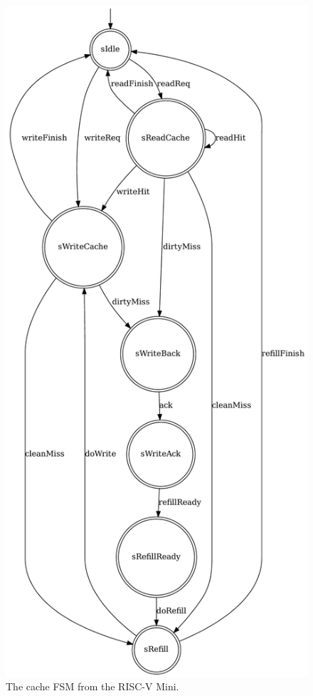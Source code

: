 \documentclass[sigplan,anonymous,review]{acmart}
\begin{document}
\begin{figure}
    \centering
    \includegraphics[width=0.7\linewidth]{figures/cacheFSM.pdf}
    \caption{The cache FSM from the RISC-V Mini.}
    \label{fig:cacheBefore}
\end{figure}
\end{document}
